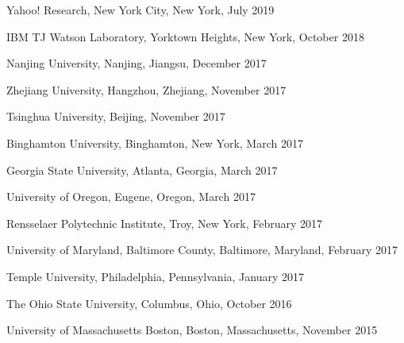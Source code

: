 \documentclass[10pt]{article}
\newenvironment{myindentpar}[1]%
{\begin{list}{}%
         {\setlength{\leftmargin}{#1}}%
         \item[]%
}
{\end{list}}
\newcounter{list}
\newcommand{\hide}[1]{}
\begin{document}
\begin{myindentpar}{0.75cm}

\hspace{-0.75cm} Yahoo! Research, New York City, New York, July 2019

\hspace{-0.75cm} IBM TJ Watson Laboratory, Yorktown Heights, New York, October 2018
	
\hspace{-0.75cm} Nanjing University, Nanjing, Jiangsu, December 2017


\hspace{-0.75cm} Zhejiang University, Hangzhou, Zhejiang, November 2017

\hspace{-0.75cm} Tsinghua University, Beijing, November 2017

\hspace{-0.75cm} Binghamton University, Binghamton, New York, March 2017

\hspace{-0.75cm} Georgia State University, Atlanta, Georgia, March 2017

\hspace{-0.75cm} University of Oregon, Eugene, Oregon, March 2017

\hspace{-0.75cm} Rensselaer Polytechnic Institute, Troy, New York, February 2017

\hspace{-0.75cm} University of Maryland, Baltimore County, Baltimore, Maryland, February 2017

\hspace{-0.75cm} Temple University, Philadelphia, Pennsylvania, January 2017

\hspace{-0.75cm} The Ohio State University, Columbus, Ohio, October 2016

\hspace{-0.75cm} University of Massachusetts Boston, Boston, Massachusetts, November 2015

\end{myindentpar}

\hide{
\subsection{\sc Notre Dame Invited Presentations}
\vspace{-0.4cm} \line(1,0){370} \vspace{-0.1cm}

\begin{myindentpar}{0.75cm}

\hspace{-0.75cm} Graduate Seminar, Department of Psychology, October 2018

\end{myindentpar}
}
\end{document}
